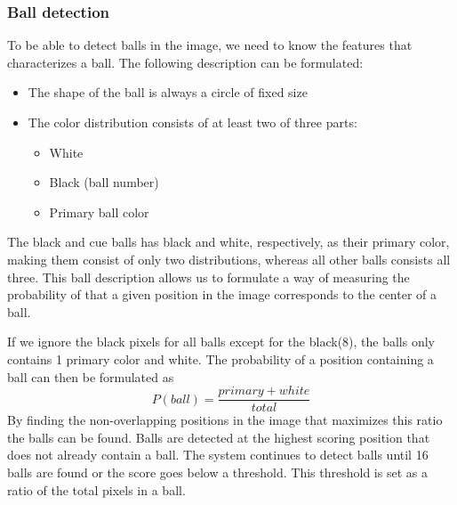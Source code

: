 \subsubsection{Ball detection}
To be able to detect balls in the image, we need to know the features that characterizes a ball. The following description can be formulated:
\begin{itemize}
\item The shape of the ball is always a circle of fixed size
\item The color distribution consists of at least two of three parts:
	\begin{itemize}
		\item White
		\item Black (ball number)
		\item Primary ball color
	\end{itemize}
\end{itemize}
The black and cue balls has black and white, respectively, as their primary color, making them consist of only two distributions, whereas all other balls consists all three. This ball description allows us to formulate a way of measuring the probability of that a given position in the image corresponds to the center of a ball.

If we ignore the black pixels for all balls except for the black(8), the balls only contains 1 primary color and white. The probability of a position containing a ball can then be formulated as
\begin{equation}
P(ball) = \frac{primary + white}{total}
\end{equation}
By finding the non-overlapping positions in the image that maximizes this ratio the balls can be found. Balls are detected at the highest scoring position that does not already contain a ball. The system continues to detect balls until 16 balls are found or the score goes below a threshold. This threshold is set as a ratio of the total pixels in a ball.

